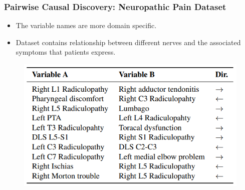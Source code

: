 \documentclass{beamer}
\begin{document}
\begin{frame}
	\frametitle{Pairwise Causal Discovery: Neuropathic Pain Dataset}
	\begin{itemize}
		\item The variable names are more domain specific.
		\item Dataset contains relationship between different nerves and the associated symptoms that patients express.
	\end{itemize}
	\begin{figure}
		\centering
		\includegraphics[scale=0.5]{imgs/table3.png}
	\end{figure}
\end{frame}
\end{document}
